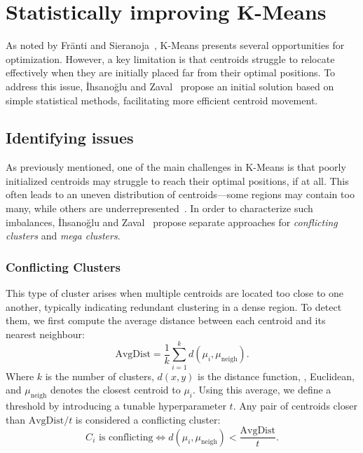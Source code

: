 \documentclass[10pt,twocolumn,letterpaper]{article}
\begin{document}

\section{Statistically improving K-Means}\label{sec:statistically-improving-k-means}

As noted by Fränti and Sieranoja~\cite{FRANTI201995}, K-Means presents several
opportunities for optimization. However, a key limitation is that centroids
struggle to relocate effectively when they are initially placed far from their
optimal positions. To address this issue, İhsanoğlu and
Zaval~\cite{Abdullah10601123} propose an initial solution based on simple
statistical methods, facilitating more efficient centroid movement.


\subsection{Identifying issues}\label{subsec:identifying-issues}

As previously mentioned, one of the main challenges in K-Means is that poorly
initialized centroids may struggle to reach their optimal positions, if at all.
This often leads to an uneven distribution of centroids—some regions may
contain too many, while others are underrepresented~\cite{FRANTI201995}. In
order to characterize such imbalances, İhsanoğlu and
Zaval~\cite{Abdullah10601123} propose separate approaches for
\textit{conflicting clusters} and \textit{mega clusters}.

\subsubsection{Conflicting Clusters}

This type of cluster arises when multiple centroids are located too close to
one another, typically indicating redundant clustering in a dense region. To
detect them, we first compute the average distance between each centroid and
its nearest neighbour:
\begin{equation}
    \label{eq:avgDist}
    \text{AvgDist} = \frac{1}{k} \sum_{i=1}^{k} d(\mu_i, \mu_{\text{neigh}}).
\end{equation}
Where $k$ is the number of clusters, $d(x,y)$ is the distance function, \eg, Euclidean, and $\mu_{\text{neigh}}$ denotes the closest centroid to $\mu_i$.
Using this average, we define a threshold by introducing a tunable
hyperparameter $t$. Any pair of centroids closer than $\text{AvgDist} / t$ is
considered a conflicting cluster:
\begin{equation}
    \label{eq:conflicting-cluster}
    C_i \text{ is conflicting} \iff d(\mu_i, \mu_{\text{neigh}}) < \frac{\text{AvgDist}}{t}.
\end{equation}
\end{document}
